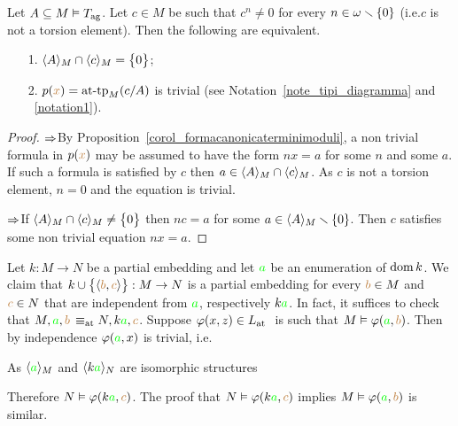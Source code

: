 \documentclass[creche.tex]{subfiles}
\begin{document}
\begin{proposition}
Let $A\subseteq M\models T_{\rm ag}$. Let $c\in M$ be such that $c^n\neq0$ for every $n\in\omega\sm\{0\}$ (i.e.\@ $c$ is not a torsion element). Then the following are equivalent.
\begin{itemize}
 \item[1.] $\<A\>_M\cap\<c\>_M=\big\{0\big\}$;
 \item[2.] $p({\mr x})=\attp_M(c/A)$ is trivial (see Notation~\ref{note_tipi_diagramma} and ~\ref{notation1}).
\end{itemize}
\end{proposition}
\begin{proof}
$\IMP$\quad By Proposition~\ref{corol_formacanonicaterminimoduli}, a non trivial formula in $p({\mr x})$ may be assumed to have the form $nx=a$ for some $n$ and some $a$. If such a formula is satisfied by $c$ then $a\in\<A\>_M\cap\<c\>_M$. As $c$ is not a torsion element, $n=0$ and the equation is trivial.

$\IMP$\quad If $\<A\>_M\cap\<c\>_M\neq\big\{0\big\}$ then $nc=a$ for some $a\in\<A\>_M\sm\{0\}$. Then $c$ satisfies some non trivial equation $nx=a$.
\end{proof}


\begin{remark}\label{oss_liberi_qf}
Let $k:M\to N$ be a partial embedding and let ${\gr a}$ be an enumeration of $\dom k$. We claim that  $k\cup\big\{\<{\mr b},{\mr c}\>\big\}:M\to N$ is a partial embedding for every ${\mr b}\in M$ and ${\mr c}\in N$ that are independent from ${\gr a}$, respectively $k{\gr a}$. In fact, it suffices to check that $M,{\gr a},{\mr b}\,\equiv_{\rm at}N,k{\gr a}, {\mr c}$. Suppose $\phi(x,z)\in\atL$ \ is such that $M\models\phi({\gr a},{\mr b})$. Then by independence $\phi({\gr a},x)$ is trivial, i.e.


As $\<{\gr a}\>_M$ and  $\<k{\gr a}\>_N$ are isomorphic structures 


Therefore $N\models\phi(k{\gr a},{\mr c})$. The proof that $N\models\phi(k{\gr a},{\mr c})$ implies $M\models\phi({\gr a},{\mr b})$ is similar.\QED 
\end{remark}



\end{document}
